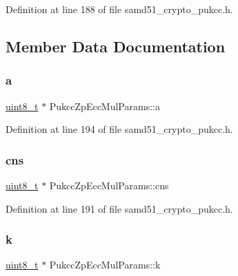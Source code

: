 Definition at line 188 of file samd51\+\_\+crypto\+\_\+pukcc.\+h.



\subsection{Member Data Documentation}
\mbox{\label{structPukccZpEccMulParams_aa0a8b0bc9f5ecd329f7abbb4727d2bf8}} 
\subsubsection{\texorpdfstring{a}{a}}
{\footnotesize\ttfamily \hyperlink{stdint_8h_aba7bc1797add20fe3efdf37ced1182c5}{uint8\+\_\+t} $\ast$ Pukcc\+Zp\+Ecc\+Mul\+Params\+::a}



Definition at line 194 of file samd51\+\_\+crypto\+\_\+pukcc.\+h.

\mbox{\label{structPukccZpEccMulParams_a4db4d800164548e8860757561f4b8e4c}} 
\subsubsection{\texorpdfstring{cns}{cns}}
{\footnotesize\ttfamily \hyperlink{stdint_8h_aba7bc1797add20fe3efdf37ced1182c5}{uint8\+\_\+t} $\ast$ Pukcc\+Zp\+Ecc\+Mul\+Params\+::cns}



Definition at line 191 of file samd51\+\_\+crypto\+\_\+pukcc.\+h.

\mbox{\label{structPukccZpEccMulParams_a9ac059035c463cbe4f2f94521e1c4e30}} 
\subsubsection{\texorpdfstring{k}{k}}
{\footnotesize\ttfamily \hyperlink{stdint_8h_aba7bc1797add20fe3efdf37ced1182c5}{uint8\+\_\+t} $\ast$ Pukcc\+Zp\+Ecc\+Mul\+Params\+::k}



